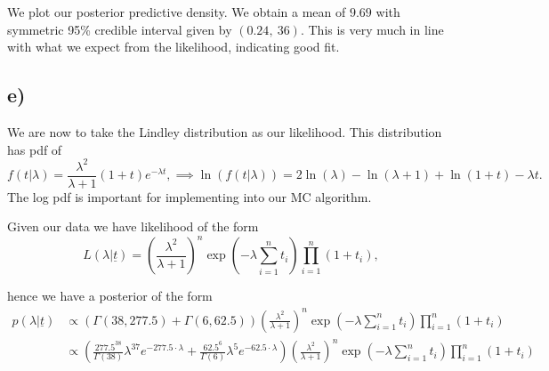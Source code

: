 \documentclass[12pt]{extarticle}
\begin{document}
We plot our posterior predictive density. We obtain a mean of $9.69$ with symmetric 95\% credible interval given by $(0.24, \  36)$. This is very much in line with what we expect from the likelihood, indicating good fit.

\subsection*{e)}
We are now to take the Lindley distribution as our likelihood. This distribution has pdf of
\[
f(t|\lambda) = \frac{\lambda^2}{\lambda+1}(1+t)e^{-\lambda t}, \implies \ln(f(t|\lambda)) = 2\ln(\lambda) - \ln(\lambda + 1) + \ln(1+t) - \lambda t.
\]
The log pdf is important for implementing into our MC algorithm. 

Given our data we have likelihood of the form 
\[
L(\lambda|\underline{t}) = \left(\frac{\lambda^2}{\lambda+1}\right)^n\exp\left(-\lambda\sum_{i=1}^{n}t_i\right)\prod_{i=1}^{n}(1+t_i),
\]

hence we have a posterior of the form
\begin{align*}
p(\lambda|\underline{t}) &\propto \left(\Gamma(38, 277.5) + \Gamma(6, 62.5)\right)\left(\frac{\lambda^2}{\lambda+1}\right)^n\exp\left(-\lambda\sum_{i=1}^{n}t_i\right)\prod_{i=1}^{n}(1+t_i)\\
&\propto \left(\frac{277.5^{38}}{\Gamma(38)}\lambda^{37}e^{-277.5\cdot \lambda} + \frac{62.5^6}{\Gamma(6)}\lambda^{5}e^{-62.5\cdot \lambda}\right)\left(\frac{\lambda^2}{\lambda+1}\right)^n\exp\left(-\lambda\sum_{i=1}^{n}t_i\right)\prod_{i=1}^{n}(1+t_i)
\end{align*}
\end{document}
